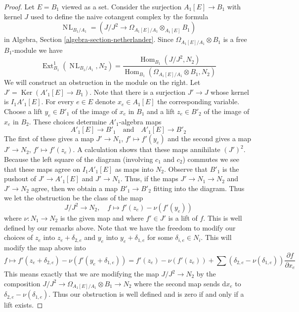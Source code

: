 \documentclass[10pt,a4paper]{amsart}
\theoremstyle{plain}
\theoremstyle{definition}
\theoremstyle{remark}
\numberwithin{equation}{subsection}
\def\Hom{\mathop{\mathrm{Hom}}\nolimits}
\def\Ext{\mathop{\mathrm{Ext}}\nolimits}
\def\NL{\mathop{N\!L}\nolimits}
\def\Ker{\mathop{\mathrm{Ker}}}
\begin{document}
\begin{proof}
Let $E = B_1$ viewed as a set.
Consider the surjection $A_1[E] \to B_1$ with kernel $J$ used
to define the naive cotangent complex by the formula
$$
\NL_{B_1/A_1} = (J/J^2 \to \Omega_{A_1[E]/A_1} \otimes_{A_1[E]} B_1)
$$
in
Algebra, Section \ref{algebra-section-netherlander}.
Since $\Omega_{A_1[E]/A_1} \otimes B_1$ is a free
$B_1$-module we have
$$
\Ext^1_{B_1}(\NL_{B_1/A_1}, N_2) =
\frac{\Hom_{B_1}(J/J^2, N_2)}
{\Hom_{B_1}(\Omega_{A_1[E]/A_1} \otimes B_1, N_2)}
$$
We will construct an obstruction in the module on the right.
Let $J' = \Ker(A'_1[E] \to B_1)$. Note that there is a surjection
$J' \to J$ whose kernel is $I_1A'_1[E]$.
For every $e \in E$ denote $x_e \in A_1[E]$ the corresponding variable.
Choose a lift $y_e \in B'_1$ of the image of $x_e$ in $B_1$ and
a lift $z_e \in B'_2$ of the image of $x_e$ in $B_2$.
These choices determine $A'_1$-algebra maps
$$
A'_1[E] \to B'_1 \quad\text{and}\quad A'_1[E] \to B'_2
$$
The first of these gives a map $J' \to N_1$, $f' \mapsto f'(y_e)$
and the second gives a map $J' \to N_2$, $f' \mapsto f'(z_e)$.
A calculation shows that these maps annihilate $(J')^2$.
Because the left square of the diagram (involving $c_1$ and $c_2$)
commutes we see that these maps agree on $I_1A'_1[E]$ as maps into $N_2$.
Observe that $B'_1$ is the pushout of $J' \to A'_1[E]$ and $J' \to N_1$. 
Thus, if the maps $J' \to N_1 \to N_2$ and $J' \to N_2$ agree, then we
obtain a map $B'_1 \to B'_2$ fitting into the diagram.
Thus we let the obstruction be the class of the map
$$
J/J^2 \to N_2,\quad f \mapsto f'(z_e) - \nu(f'(y_e))
$$
where $\nu : N_1 \to N_2$ is the given map and where $f' \in J'$
is a lift of $f$. This is well defined by our remarks above.
Note that we have the freedom
to modify our choices of $z_e$ into $z_e + \delta_{2, e}$
and $y_e$ into $y_e + \delta_{1, e}$ for some $\delta_{i, e} \in N_i$.
This will modify the map above into
$$
f \mapsto f'(z_e + \delta_{2, e}) - \nu(f'(y_e + \delta_{1, e})) =
f'(z_e) - \nu(f'(z_e)) +
\sum (\delta_{2, e} - \nu(\delta_{1, e}))\frac{\partial f}{\partial x_e}
$$
This means exactly that we are modifying the map $J/J^2 \to N_2$
by the composition $J/J^2 \to \Omega_{A_1[E]/A_1} \otimes B_1 \to N_2$
where the second map sends $\text{d}x_e$ to
$\delta_{2, e} - \nu(\delta_{1, e})$. Thus our obstruction is well defined
and is zero if and only if a lift exists.


\end{proof}
\end{document}
